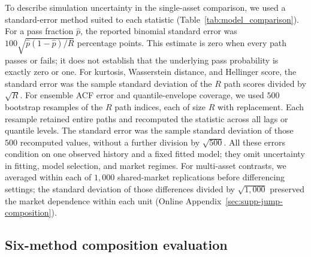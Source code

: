 To describe simulation uncertainty in the single-asset comparison,
we used a standard-error method suited to each statistic
(Table~\ref{tab:model_comparison}). For a pass fraction $\hat p$,
the reported binomial standard error was
$100\sqrt{\hat p(1-\hat p)/R}$ percentage points. This estimate is
zero when every path passes or fails; it does not establish that the
underlying pass probability is exactly zero or one. For kurtosis,
Wasserstein distance, and Hellinger score, the standard error was
the sample standard deviation of the $R$ path scores divided by
$\sqrt R$. For ensemble ACF error and quantile-envelope coverage,
we used $500$ bootstrap resamples of the $R$ path indices, each of
size $R$ with replacement. Each resample retained entire paths and
recomputed the statistic across all lags or quantile levels. The
standard error was the sample standard deviation of those $500$
recomputed values, without a further division by $\sqrt{500}$.
All these errors condition on one observed history and a fixed fitted
model; they omit uncertainty in fitting, model selection, and market
regimes. For multi-asset contrasts, we averaged within each of $1{,}000$ shared-market replications before differencing settings; the standard deviation of those differences divided by $\sqrt{1{,}000}$ preserved the market dependence within each unit (Online Appendix~\ref{sec:supp-jump-composition}).

\subsection{Six-method composition evaluation}
\label{sec:supp-composition-evaluation}

